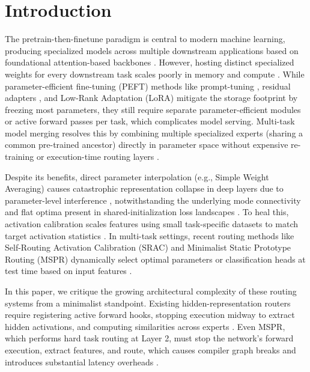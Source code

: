 \documentclass{article}
\theoremstyle{plain}
\theoremstyle{definition}
\theoremstyle{remark}
\begin{document}
\section{Introduction}
\label{sec:intro}
The pretrain-then-finetune paradigm is central to modern machine learning, producing specialized models across multiple downstream applications based on foundational attention-based backbones \citep{Vaswani_2017, Devlin_2018, Radford_2019, Brown_2020}. However, hosting distinct specialized weights for every downstream task scales poorly in memory and compute \citep{Ruder_2017, Shazeer_2017, Fedus_2022}. While parameter-efficient fine-tuning (PEFT) methods like prompt-tuning \citep{Lester_2021}, residual adapters \citep{Houlsby_2019, Rebuffi_2017, Pfeiffer_2020}, and Low-Rank Adaptation (LoRA) \citep{Hu_2021, Karimi_2021, Zaken_2021} mitigate the storage footprint by freezing most parameters, they still require separate parameter-efficient modules or active forward passes per task, which complicates model serving. Multi-task model merging resolves this by combining multiple specialized experts (sharing a common pre-trained ancestor) directly in parameter space without expensive re-training or execution-time routing layers \citep{Wortsman_2022, Ilharco_2023, Ainsworth_2022, Matena_2021, Choshen_2022}.

Despite its benefits, direct parameter interpolation (e.g., Simple Weight Averaging) causes catastrophic representation collapse in deep layers due to parameter-level interference \citep{Jordan_2023, Mu_2024}, notwithstanding the underlying mode connectivity and flat optima present in shared-initialization loss landscapes \citep{garipov2018loss, Izmailov_2018, Rame_2022}. To heal this, activation calibration scales features using small task-specific datasets to match target activation statistics \citep{Jordan_2023, Authors_2026c}. In multi-task settings, recent routing methods like Self-Routing Activation Calibration (SRAC) and Minimalist Static Prototype Routing (MSPR) dynamically select optimal parameters or classification heads at test time based on input features \citep{Authors_2026a, Authors_2026b}.

In this paper, we critique the growing architectural complexity of these routing systems from a minimalist standpoint. Existing hidden-representation routers require registering active forward hooks, stopping execution midway to extract hidden activations, and computing similarities across experts \citep{Authors_2026a}. Even MSPR, which performs hard task routing at Layer 2, must stop the network's forward execution, extract features, and route, which causes compiler graph breaks and introduces substantial latency overheads \citep{Authors_2026b}.
\end{document}
